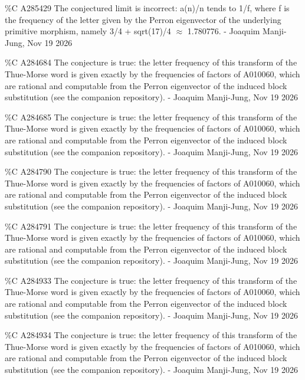 {\%C A285429 The conjectured limit is incorrect: a(n)/n tends to 1/f, where f is the frequency of the letter given by the Perron eigenvector of the underlying primitive morphism, namely 3/4 + sqrt(17)/4 $\approx$ 1.780776. - Joaquim Manji-Jung, Nov 19 2026\par
\%C A284684 The conjecture is true: the letter frequency of this transform of the Thue-Morse word is given exactly by the frequencies of factors of A010060, which are rational and computable from the Perron eigenvector of the induced block substitution (see the companion repository). - Joaquim Manji-Jung, Nov 19 2026\par
\%C A284685 The conjecture is true: the letter frequency of this transform of the Thue-Morse word is given exactly by the frequencies of factors of A010060, which are rational and computable from the Perron eigenvector of the induced block substitution (see the companion repository). - Joaquim Manji-Jung, Nov 19 2026\par
\%C A284790 The conjecture is true: the letter frequency of this transform of the Thue-Morse word is given exactly by the frequencies of factors of A010060, which are rational and computable from the Perron eigenvector of the induced block substitution (see the companion repository). - Joaquim Manji-Jung, Nov 19 2026\par
\%C A284791 The conjecture is true: the letter frequency of this transform of the Thue-Morse word is given exactly by the frequencies of factors of A010060, which are rational and computable from the Perron eigenvector of the induced block substitution (see the companion repository). - Joaquim Manji-Jung, Nov 19 2026\par
\%C A284933 The conjecture is true: the letter frequency of this transform of the Thue-Morse word is given exactly by the frequencies of factors of A010060, which are rational and computable from the Perron eigenvector of the induced block substitution (see the companion repository). - Joaquim Manji-Jung, Nov 19 2026\par
\%C A284934 The conjecture is true: the letter frequency of this transform of the Thue-Morse word is given exactly by the frequencies of factors of A010060, which are rational and computable from the Perron eigenvector of the induced block substitution (see the companion repository). - Joaquim Manji-Jung, Nov 19 2026\par
}

